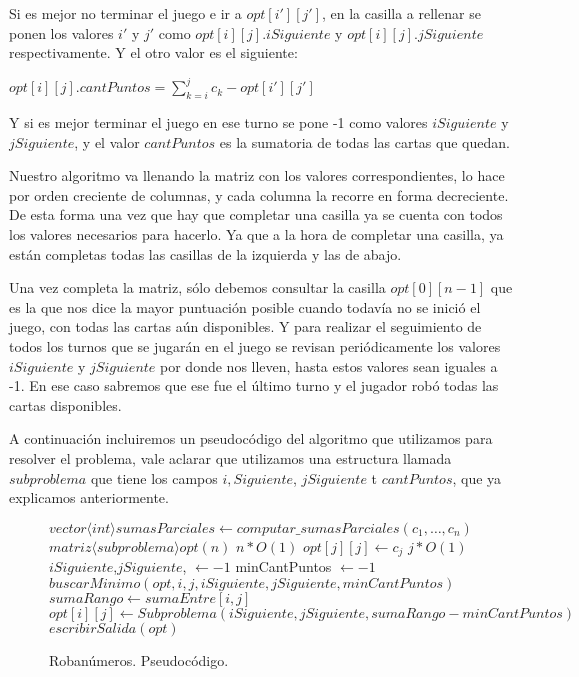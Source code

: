 Si es mejor no terminar el juego e ir a $opt[i'][j']$,  en la casilla a rellenar se ponen los valores $i'$ y $j'$ como $opt[i][j].iSiguiente$ y $opt[i][j].jSiguiente$ respectivamente. Y el otro valor es el siguiente:

$opt[i][j].cantPuntos = \sum_{k=i}^{j} c_k - opt[i'][j']$

Y si es mejor terminar el juego en ese turno se pone -1 como valores $iSiguiente$ y $jSiguiente$, y el valor $cantPuntos$ es la sumatoria de todas las cartas que quedan.

Nuestro algoritmo va llenando la matriz con los valores correspondientes, lo hace por orden creciente de columnas,  y cada columna la recorre en forma decreciente. De esta forma una vez que hay que completar una casilla ya se cuenta con todos los valores necesarios para hacerlo. Ya que a la hora de completar una casilla, ya están completas todas las casillas de la izquierda y las de abajo. 

Una vez completa la matriz, sólo debemos consultar la casilla $opt[0][n-1]$ que es la que nos dice la mayor puntuación posible cuando todavía no se inició el juego, con todas las cartas aún disponibles. Y para realizar el seguimiento de todos los turnos que se jugarán en el juego se revisan periódicamente los valores $iSiguiente$ y $jSiguiente$ por donde nos lleven, hasta estos valores sean iguales a -1. En ese caso sabremos que ese fue el último turno y el jugador robó todas las cartas disponibles.

A continuación incluiremos un pseudocódigo del algoritmo que utilizamos para resolver el problema, vale aclarar que utilizamos una estructura llamada $subproblema$ que tiene los campos $i,Siguiente$, $jSiguiente$ t $cantPuntos$, que ya explicamos anteriormente. 

\begin{center}
\begin{figure}[H]
    \begin{pseudo}
            \State $vector\langle int \rangle sumasParciales \leftarrow computar\_sumasParciales(c_1, \ldots, c_n)$ 
            \State $matriz\langle subproblema \rangle opt(n)$ 
             \hfill $n*O(1)$
                \State $opt[j][j] \leftarrow c_j$
                 \hfill $j*O(1)$
                    \State $iSiguiente$,$jSiguiente$, $ \leftarrow -1$ 
                    \State minCantPuntos $\leftarrow -1$ 
		    \State $buscarMinimo(opt,i,j,iSiguiente,jSiguiente,minCantPuntos)$ 
		    \State $sumaRango \leftarrow sumaEntre[i,j]$ 
		    \State $opt[i][j] \leftarrow Subproblema(iSiguiente,jSiguiente, sumaRango - minCantPuntos)$ 
		 \EndFor
            \EndFor
            \State $escribirSalida(opt)$ 
        \EndProcedure
    \end{pseudo}
    \caption{Robanúmeros. Pseudocódigo.}
    \label{problema1-pseudo}
\end{figure}
\end{center}

